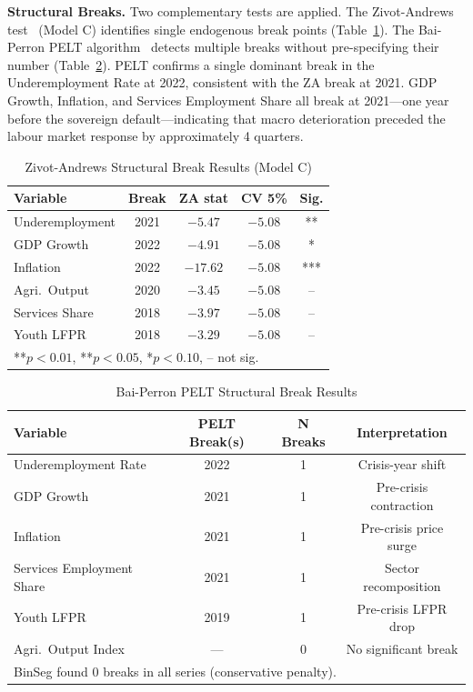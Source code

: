 \documentclass[sigconf]{acmart}
\begin{document}
\textbf{Structural Breaks.} Two complementary tests are applied. The Zivot-Andrews test~\cite{zivot1992} (Model C) identifies single endogenous break points (Table~\ref{tab:za}). The Bai-Perron PELT algorithm~\cite{pesaran2001} detects multiple breaks without pre-specifying their number (Table~\ref{tab:bp}). PELT confirms a single dominant break in the Underemployment Rate at 2022, consistent with the ZA break at 2021. GDP Growth, Inflation, and Services Employment Share all break at 2021---one year before the sovereign default---indicating that macro deterioration preceded the labour market response by approximately 4 quarters.

\begin{table}[h]
\caption{Zivot-Andrews Structural Break Results (Model C)}
\label{tab:za}
\setlength{\tabcolsep}{3pt}
\footnotesize
\begin{tabular}{lcccc}
\toprule
\textbf{Variable} & \textbf{Break} & \textbf{ZA stat} & \textbf{CV 5\%} & \textbf{Sig.}\\
\midrule
Underemployment  & 2021 & $-5.47$ & $-5.08$ & **  \\
GDP Growth       & 2022 & $-4.91$ & $-5.08$ & *   \\
Inflation        & 2022 & $-17.62$ & $-5.08$ & *** \\
Agri.\ Output    & 2020 & $-3.45$ & $-5.08$ & --  \\
Services Share   & 2018 & $-3.97$ & $-5.08$ & --  \\
Youth LFPR       & 2018 & $-3.29$ & $-5.08$ & --  \\
\midrule
\multicolumn{5}{l}{\scriptsize ***$p{<}0.01$, **$p{<}0.05$, *$p{<}0.10$, -- not sig.}\\
\bottomrule
\end{tabular}
\end{table}

\begin{table}[h]
\caption{Bai-Perron PELT Structural Break Results}
\label{tab:bp}
\setlength{\tabcolsep}{3pt}
\footnotesize
\begin{tabular}{lccc}
\toprule
\textbf{Variable} & \textbf{PELT Break(s)} & \textbf{N Breaks} & \textbf{Interpretation}\\
\midrule
Underemployment Rate      & 2022 & 1 & Crisis-year shift \\
GDP Growth                & 2021 & 1 & Pre-crisis contraction \\
Inflation                 & 2021 & 1 & Pre-crisis price surge \\
Services Employment Share & 2021 & 1 & Sector recomposition \\
Youth LFPR                & 2019 & 1 & Pre-crisis LFPR drop \\
Agri.\ Output Index       & ---  & 0 & No significant break \\
\midrule
\multicolumn{4}{l}{\scriptsize BinSeg found 0 breaks in all series (conservative penalty).}\\
\bottomrule
\end{tabular}
\end{table}
\end{document}
